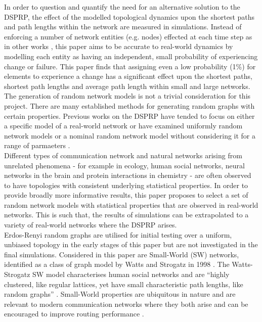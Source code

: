 \documentclass[
	a4paper, %
	10pt, %
	unnumberedsections, %
	twoside, %
]{LTJournalArticle}
\begin{document}
In order to question and quantify the need for an alternative solution to the DSPRP, the effect of the modelled topological dynamics upon the shortest paths and path lengths within the network are measured in simulations. Instead of enforcing a number of network entities (e.g. nodes) effected at each time step as in other works \cite{yang:10}, this paper aims to be accurate to real-world dynamics by modelling each entity as having an independent, small probability of experiencing change or failure. This paper finds that assigning even a low probability (1\%) for elements to experience a change has a significant effect upon the shortest paths, shortest path lengths and average path length within small and large networks. \\

The generation of random network models is not a trivial consideration for this project. There are many established methods for generating random graphs with certain properties. Previous works on the DSPRP have tended to focus on either a specific model of a real-world network \cite{yang:10} or have examined uniformly random network models or a nominal random network model without considering it for a range of parmaeters \cite{kumar:10} \cite{yussof:09}. \\

Different types of communication network and natural networks arising from unrelated phenomena - for example in ecology, human social networks, neural networks in the brain and protein interactions in chemistry - are often observed to have topologies with consistent underlying statistical properties. In order to provide broadly more informative results, this paper proposes to select a set of random network models with statistical properties that are observed in real-world networks. This is such that, the results of simulations can be extrapolated to a variety of real-world networks where the DSPRP arises. \\

Erdos-Renyi random graphs are utilised for initial testing over a uniform, unbiased topology in the early stages of this paper but are not investigated in the final simulations. Considered in this paper are Small-World (SW) networks, identified as a class of graph model by Watts and Strogatz in 1998 \cite{watts:98}. The Watts-Strogatz SW model characterises human social networks and are ``highly clustered, like regular lattices, yet have small characteristic path lengths, like random graphs'' \cite{watts:98}. Small-World properties are ubiquitous in nature \cite{telesford:11} and are relevant to modern communication networks where they both arise and can be encouraged to improve routing performance \cite{dong:15}. \\
\end{document}
